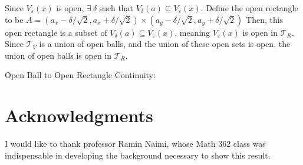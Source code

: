 \documentclass[12pt]{extarticle}
\begin{document}
\begin{description}
      Since $V_{\varepsilon}(x)$ is open, $\exists~\delta$ such that $V_{\delta}(a)\subseteq V_{\varepsilon}(x)$. Define the open rectangle to be $A = (a_x-\delta/\sqrt{2},a_x+\delta/\sqrt{2})\times(a_y-\delta/\sqrt{2},a_y + \delta/\sqrt{2})$ Then, this open rectangle is a subset of $V_{\delta}(a)\subseteq V_{\varepsilon}(x)$, meaning $V_{\varepsilon}(x)$ is open in $\mathcal{T}_R$. Since $\mathcal{T}_V$ is a union of open balls, and the union of these open sets is open, the union of open balls is open in $\mathcal{T}_R$.\\
        \begin{center}
          Open Ball to Open Rectangle Continuity:\\
          \vspace{12pt}
        \end{center}
  \end{description}
  \section*{Acknowledgments}%
  I would like to thank professor Ramin Naimi, whose Math 362 class was indispensable in developing the background necessary to show this result.
  \printbibliography
\end{document}
